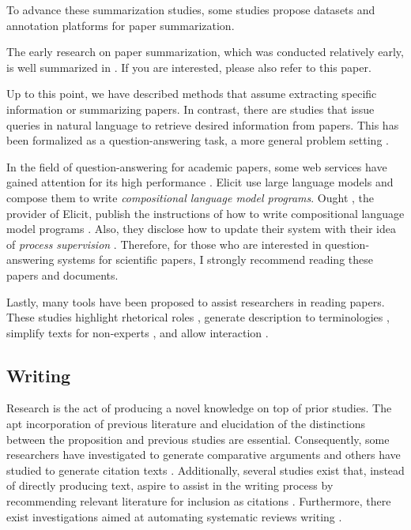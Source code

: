 \documentclass{book}
\begin{document}
To advance these summarization studies, some studies propose datasets \cite{yasunaga2019scisummnet,bastan2022sume} and annotation platforms \cite{el2022platform} for paper summarization. 

The early research on paper summarization, which was conducted relatively early, is well summarized in \cite{altmami2022automatic}. If you are interested, please also refer to this paper.

Up to this point, we have described methods that assume extracting specific information or summarizing papers. In contrast, there are studies that issue queries in natural language to retrieve desired information from papers. This has been formalized as a question-answering task, a more general problem setting \cite{lu2022learn,ruggeri2022argscichat,saikh2022scienceqa}. 

In the field of question-answering for academic papers, some web services have gained attention for its high performance \cite{elicit,scispace}. Elicit use large language models and compose them to write \textit{compositional language model programs}. Ought \cite{ought}, the provider of Elicit, publish the instructions of how to write compositional language model programs \cite{primer2022}. Also, they disclose how to update their system with their idea of \textit{process supervision} \cite{reppert2023iterated}. Therefore, for those who are interested in question-answering systems for scientific papers, I strongly recommend reading these papers and documents.

Lastly, many tools have been proposed to assist researchers in reading papers. These studies highlight rhetorical roles \cite{fok2023scim,lauscher2018arguminsci}, generate description to terminologies \cite{august2022generating,head2021augmenting,murthy2022accord}, simplify texts for non-experts \cite{august2022paper,jeblick2022chatgpt}, and allow interaction \cite{kang2022threddy,elicit,scispace}.

\subsection{Writing}
Research is the act of producing a novel knowledge on top of prior studies. The apt incorporation of previous literature and elucidation of the distinctions between the proposition and previous studies are essential. Consequently, some researchers have investigated to generate comparative arguments \cite{yu2022scientific} and others have studied to generate citation texts \cite{arita2022citation,gu2022controllable,wang2021autocite,xing2020automatic,funkquist2022citebench}. Additionally, several studies exist that, instead of directly producing text, aspire to assist in the writing process by recommending relevant literature for inclusion as citations \cite{farber2020citation,zhang2020dual,duma2019contextual,farber2018cite,gosangi2021use}. Furthermore, there exist investigations aimed at automating systematic reviews writing \cite{dones2022systematic}.
\end{document}
